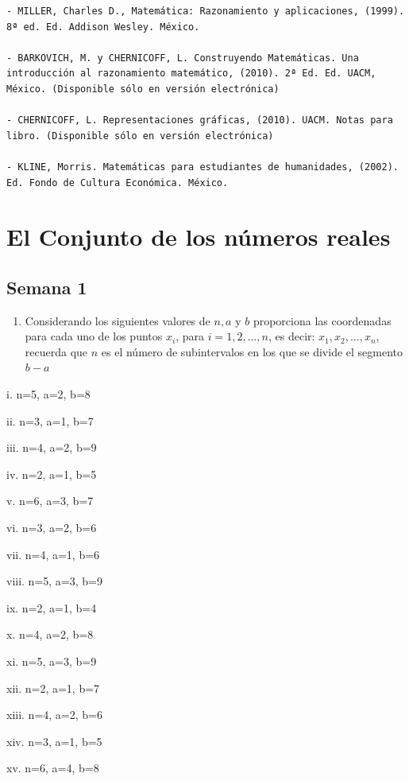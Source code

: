 \documentclass[]{book}
\providecommand{\tightlist}{%
  \setlength{\itemsep}{0pt}\setlength{\parskip}{0pt}}
\begin{document}
\begin{verbatim}
- MILLER, Charles D., Matemática: Razonamiento y aplicaciones, (1999). 8ª ed. Ed. Addison Wesley. México.

- BARKOVICH, M. y CHERNICOFF, L. Construyendo Matemáticas. Una introducción al razonamiento matemático, (2010). 2ª Ed. Ed. UACM, México. (Disponible sólo en versión electrónica)

- CHERNICOFF, L. Representaciones gráficas, (2010). UACM. Notas para libro. (Disponible sólo en versión electrónica)

- KLINE, Morris. Matemáticas para estudiantes de humanidades, (2002). Ed. Fondo de Cultura Económica. México.
\end{verbatim}

\chapter{El Conjunto de los números
reales}\label{el-conjunto-de-los-nuxfameros-reales}

\section{Semana 1}\label{semana-1}

\begin{enumerate}
\def\labelenumi{\arabic{enumi}.}
\tightlist
\item
  Considerando los siguientes valores de \(n,a\) y \(b\) proporciona las
  coordenadas para cada uno de los puntos \(x_i\), para
  \(i=1,2,\ldots,n\), es decir: \(x_1,x_2,\ldots,x_n\), recuerda que
  \(n\) es el número de subintervalos en los que se divide el segmento
  \(b-a\)
\end{enumerate}

\begin{multicols}{2}
   
    i. n=5, a=2, b=8
   
    ii. n=3, a=1, b=7
   
    iii. n=4, a=2, b=9
   
    iv. n=2, a=1, b=5
   
    v. n=6, a=3, b=7
   
    vi. n=3, a=2, b=6
   
    vii. n=4, a=1, b=6
   
    viii. n=5, a=3, b=9
   
    ix. n=2, a=1, b=4
   
    x. n=4, a=2, b=8
   
    xi. n=5, a=3, b=9
   
    xii. n=2, a=1, b=7
   
    xiii. n=4, a=2, b=6
   
    xiv. n=3, a=1, b=5
   
    xv. n=6, a=4, b=8
\end{multicols}
\end{document}
